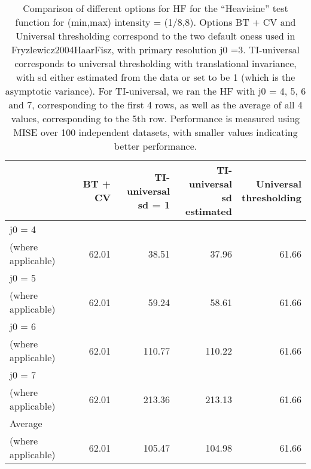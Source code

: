 \documentclass[12pt]{article}
\begin{document}
\begin{table}[ht]
\centering
\begin{tabular}{lrrrr}
  \hline
 & BT + CV & \pbox{20cm}{TI-universal \\ sd = 1} & \pbox{20cm}{TI-universal \\ sd estimated} & \pbox{20cm}{Universal \\ thresholding} \\ 
  \hline
j0 = 4 \\
 (where applicable) & 62.01 & 38.51 & 37.96 & 61.66 \\ 
  j0 = 5 \\
 (where applicable) & 62.01 & 59.24 & 58.61 & 61.66 \\ 
  j0 = 6 \\
 (where applicable) & 62.01 & 110.77 & 110.22 & 61.66 \\ 
  j0 = 7 \\
 (where applicable) & 62.01 & 213.36 & 213.13 & 61.66 \\ 
  Average \\
 (where applicable) & 62.01 & 105.47 & 104.98 & 61.66 \\ 
   \hline
\end{tabular}
\caption{Comparison of different options for HF for the ``Heavisine'' test function for (min,max) intensity = (1/8,8). Options BT + CV and Universal thresholding correspond to the two default oness used in {Fryzlewicz2004HaarFisz}, with primary resolution j0 =3. TI-universal corresponds to universal thresholding with translational invariance, with sd either estimated from the data or set to be 1 (which is the asymptotic variance). For TI-universal, we ran the HF with j0 = 4, 5, 6 and 7, corresponding to the first 4 rows, as well as the average of all 4 values, corresponding to the 5th row. Performance is measured using MISE over 100 independent datasets, with smaller values indicating better performance.} 
\label{table:pois_hf_hs_8}
\end{table}
\end{document}

